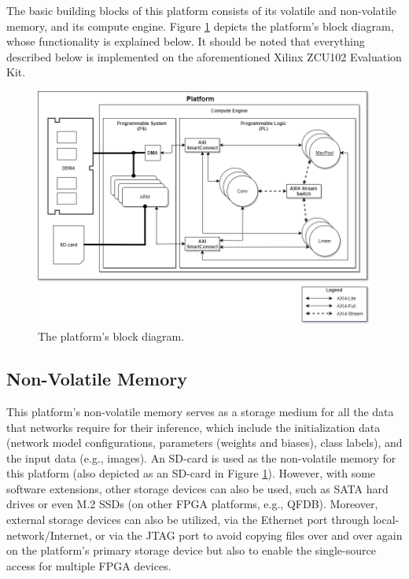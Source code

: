 The basic building blocks of this platform consists of its volatile and non-volatile memory, and its compute engine. Figure \ref{fig:platform-block-diagram} depicts the platform's block diagram, whose functionality is explained below. It should be noted that everything described below is implemented on the aforementioned Xilinx ZCU102 Evaluation Kit.

\begin{figure} [H]
	\centering
	\includegraphics[width=\textwidth]{Images/Platform/platform.png}
	\decoRule
	\caption[The platform's block diagram]{The platform's block diagram.}
	\label{fig:platform-block-diagram}
\end{figure}

\subsection{Non-Volatile Memory}
This platform's non-volatile memory serves as a storage medium for all the data that networks require for their inference, which include the initialization data (network model configurations, parameters (weights and biases), class labels), and the input data (e.g., images). An SD-card is used as the non-volatile memory for this platform (also depicted as an SD-card in Figure \ref{fig:platform-block-diagram}). However, with some software extensions, other storage devices can also be used, such as SATA hard drives or even M.2 SSDs (on other FPGA platforms, e.g., QFDB). Moreover, external storage devices can also be utilized, via the Ethernet port through local-network/Internet, or via the JTAG port to avoid copying files over and over again on the platform's primary storage device but also to enable the single-source access for multiple FPGA devices.

